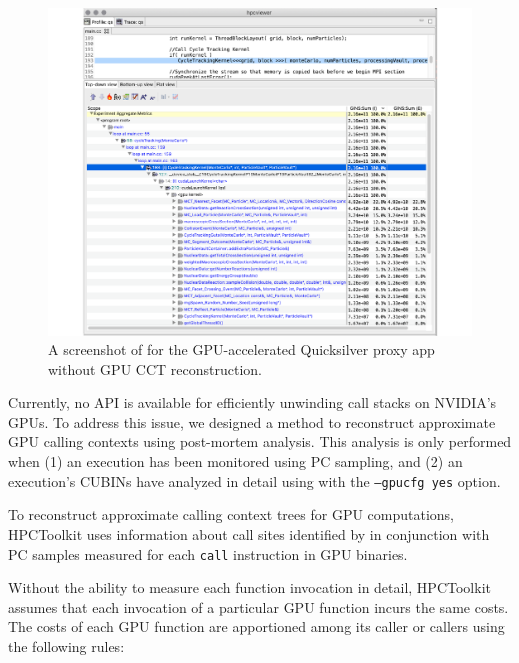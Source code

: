 \begin{figure}[t]
\centering
\includegraphics[width=\textwidth]{fig/qs-no-cct.pdf}
\caption{A screenshot of \hpcviewer{} for the GPU-accelerated Quicksilver proxy app without GPU CCT reconstruction.}
\label{qs-no-cct}
\end{figure}


Currently, no API is available for efficiently unwinding call stacks on NVIDIA's GPUs.
To address this issue, we designed a method to reconstruct approximate GPU calling contexts using post-mortem analysis. This analysis is only performed when (1) an execution has been monitored using PC sampling, and (2) an execution's CUBINs have analyzed in detail using \hpcstruct{} with the {\tt --gpucfg yes} option.

To reconstruct approximate calling context trees for GPU computations, HPCToolkit uses information about call sites identified by \hpcstruct{} in conjunction with PC samples measured for each {\tt call} instruction in GPU binaries. 

Without the ability to measure each function invocation in detail, HPCToolkit assumes that each invocation of a particular GPU function incurs the same costs. The costs of each GPU function are apportioned among its caller or callers using the following rules:

